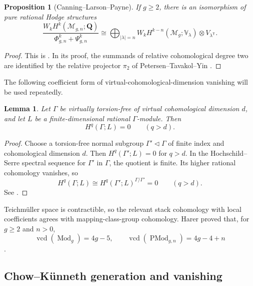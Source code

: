 \documentclass[12pt,reqno]{amsart}
\newcommand{\Q}{\mathbf{Q}}
\newcommand{\M}{\mathcal{M}}
\newcommand{\Mod}{\operatorname{Mod}}
\newcommand{\PMod}{\operatorname{PMod}}
\newcommand{\vcd}{\operatorname{vcd}}
\newtheorem{proposition}[theorem]{Proposition}
\newtheorem{lemma}[theorem]{Lemma}
\theoremstyle{definition}
\theoremstyle{remark}
\begin{document}
\begin{proposition}[Canning--Larson--Payne]\label{prop:primitive}
If $g\geq2$, there is an isomorphism of pure rational Hodge structures
\begin{equation}\label{eq:primitive}
 \frac{W_kH^k(\M_{g,n};\Q)}
      {\Phi^k_{g,n}+\Psi^k_{g,n}}
 \cong
 \bigoplus_{|\lambda|=n}
 W_kH^{k-n}(\M_g;\mathbb V_\lambda)
 \otimes V_{\lambda^{\mathsf T}}.
\end{equation}
\end{proposition}

\begin{proof}
This is \cite[Lemma~3.1(a)]{CLP}.  In its proof, the summands of relative
cohomological degree two are identified by the relative projector $\pi_2$
of Petersen--Tavakol--Yin \cite[Sections~5.1 and 5.2.2]{PTY}.
\end{proof}

The following coefficient form of virtual-cohomological-dimension
vanishing will be used repeatedly.

\begin{lemma}\label{lem:vcd-rational}
Let $\Gamma$ be virtually torsion-free of virtual cohomological dimension
$d$, and let $L$ be a finite-dimensional rational $\Gamma$-module.  Then
\[
 H^q(\Gamma;L)=0\qquad(q>d).
\]
\end{lemma}

\begin{proof}
Choose a torsion-free normal subgroup $\Gamma'\triangleleft\Gamma$ of finite
index and cohomological dimension $d$.  Then $H^q(\Gamma';L)=0$ for $q>d$.
In the Hochschild--Serre spectral sequence for $\Gamma'$ in $\Gamma$, the
quotient is finite.  Its higher rational cohomology vanishes, so
\[
 H^q(\Gamma;L)\cong H^q(\Gamma';L)^{\Gamma/\Gamma'}=0
 \qquad(q>d).
\]
See \cite[Chapter~VII]{Brown}.
\end{proof}

Teichm\"uller space is contractible, so the relevant stack cohomology with
local coefficients agrees with mapping-class-group cohomology.  Harer proved
that, for $g\geq2$ and $n>0$,
\begin{equation}\label{eq:harer-vcd}
 \vcd(\Mod_g)=4g-5,
 \qquad
 \vcd(\PMod_{g,n})=4g-4+n
\end{equation}
\cite[Theorem~4.1]{Harer}.

\subsection{Chow--K\"unneth generation and vanishing}
\end{document}
